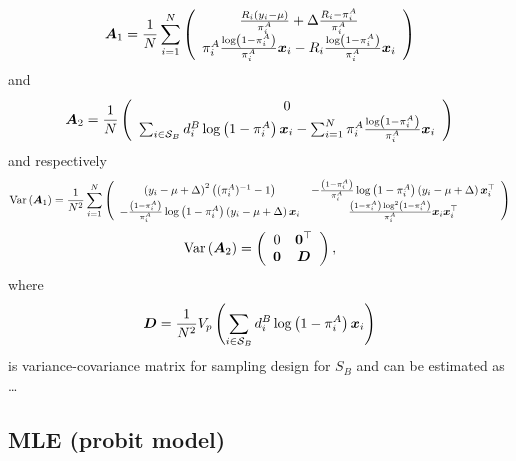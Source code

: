 \documentclass[
  letterpaper,
  DIV=11,
  numbers=noendperiod]{scrreprt}
\begin{document}
\[
\begin{equation*}
    \operatorname{\bA_1} = \frac{1}{N} \sum_{i=1}^N
    \left(\begin{array}{c}
        \frac{R_i\left(y_i - \mu\right)}{\pi_i^A} + \Delta\frac{R_i - \pi_i^A}{\pi_i^A}  \\
       \pi_i^A \frac{\log\left(1 - \pi_i^A\right)}{\pi_i^A} \bx_i -  R_i \frac{\log\left(1 - \pi_i^A\right)}{\pi_i^A} \bx_i
    \end{array}\right)
\end{equation*}
\] and \[
\begin{equation*}
    \operatorname{\bA_2} = \frac{1}{N} 
    \left(\begin{array}{c}
        0  \\
        \sum_{i \in \mathcal{S}_B} d_i^B \log \left(1 - \pi_i^A\right) \bx_i - \sum_{i=1}^N \pi_i^A  \frac{\log \left(1 - \pi_i^A\right)}{\pi_i^A} \bx_i
    \end{array}\right)
\end{equation*}
\] and respectively \[
\begin{equation*}
\operatorname{Var}\left(\bA_1\right) = \frac{1}{N^2} \sum_{i=1}^N
\left(\begin{array}{cc}
    \left(y_i - \mu + \Delta\right)^2 \left((\pi_i^A)^{-1} - 1\right)  & - \frac{\left(1 - \pi_i^A\right)}{\pi_i^A} \log\left(1 - \pi_i^A\right)\left(y_i - \mu + \Delta\right)\bx_i^{\top}  \\
    - \frac{\left(1 - \pi_i^A\right)}{\pi_i^A} \log\left(1 - \pi_i^A\right)\left(y_i - \mu + \Delta\right)\bx_i
    & \frac{\left(1 - \pi_i^A\right) \log^2\left(1 - \pi_i^A\right)}{\pi_i^A} \bx_i \bx_i^{\top}
\end{array}\right)
\end{equation*}
\] \[
\begin{equation*}
\operatorname{Var}\left(\bA_2\right) = 
\left(\begin{array}{cc}
     0 & \boldsymbol{0}^{\top} \\
     \boldsymbol{0} & \bD 
\end{array}\right),
\end{equation*}
\] where \[
\begin{align}
    \boldsymbol{D} = \frac{1}{N^2}V_p\left(\sum_{i \in \mathcal{S}_B} d_i^B \log \left(1 - \pi_i^A\right) \boldsymbol{x}_i\right) 
\end{align}
\] is variance-covariance matrix for sampling design for \(S_B\) and can
be estimated as \ldots{}

\subsection{MLE (probit model)}\label{mle-probit-model}
\end{document}
